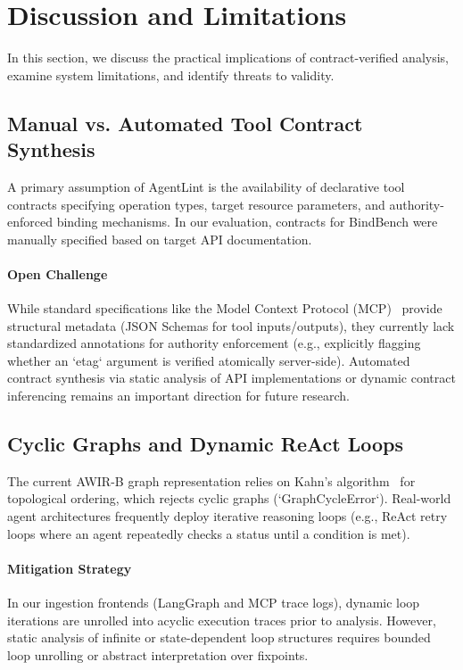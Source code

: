 \section{Discussion and Limitations}
\label{sec:discussion}

In this section, we discuss the practical implications of contract-verified analysis, examine system limitations, and identify threats to validity.

\subsection{Manual vs. Automated Tool Contract Synthesis}
A primary assumption of AgentLint is the availability of declarative tool contracts specifying operation types, target resource parameters, and authority-enforced binding mechanisms. In our evaluation, contracts for \textsf{BindBench} were manually specified based on target API documentation.

\paragraph{Open Challenge}
While standard specifications like the Model Context Protocol (MCP)~\cite{mcp2024spec} provide structural metadata (JSON Schemas for tool inputs/outputs), they currently lack standardized annotations for authority enforcement (e.g., explicitly flagging whether an `etag` argument is verified atomically server-side). Automated contract synthesis via static analysis of API implementations or dynamic contract inferencing remains an important direction for future research.

\subsection{Cyclic Graphs and Dynamic ReAct Loops}
The current \textsf{AWIR-B} graph representation relies on Kahn's algorithm~\cite{kahn1962topological} for topological ordering, which rejects cyclic graphs (`GraphCycleError`). Real-world agent architectures frequently deploy iterative reasoning loops (e.g., ReAct retry loops where an agent repeatedly checks a status until a condition is met).

\paragraph{Mitigation Strategy}
In our ingestion frontends (LangGraph and MCP trace logs), dynamic loop iterations are unrolled into acyclic execution traces prior to analysis. However, static analysis of infinite or state-dependent loop structures requires bounded loop unrolling or abstract interpretation over fixpoints.

